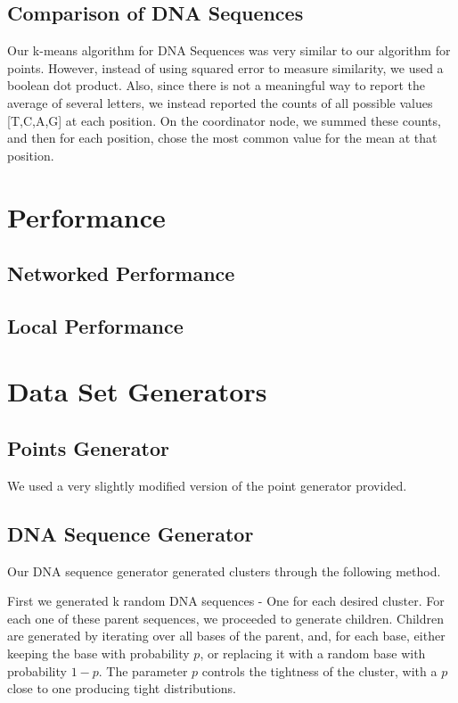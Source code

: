 \documentclass[12pt]{article}
\begin{document}
\subsection{Comparison of DNA Sequences}

Our k-means algorithm for DNA Sequences was very similar to our algorithm for points. However, instead of using squared error to measure similarity, we used a boolean dot product. Also, since there is not a meaningful way to report the average of several letters, we instead reported the counts of all possible values [T,C,A,G] at each position. On the coordinator node, we summed these counts, and then for each position, chose the most common value for the mean at that position.

\section{Performance}

\subsection{Networked Performance}

\subsection{Local Performance}

\section{Data Set Generators}

\subsection{Points Generator}

We used a very slightly modified version of the point generator provided.

\subsection{DNA Sequence Generator}

Our DNA sequence generator generated clusters through the following method.

First we generated k random DNA sequences - One for each desired cluster. For each one of these parent sequences, we proceeded to generate children. Children are generated by iterating over all bases of the parent, and, for each base, either keeping the base with probability $p$, or replacing it with a random base with probability $1-p$. The parameter $p$ controls the tightness of the cluster, with a $p$ close to one producing tight distributions.
\end{document}
